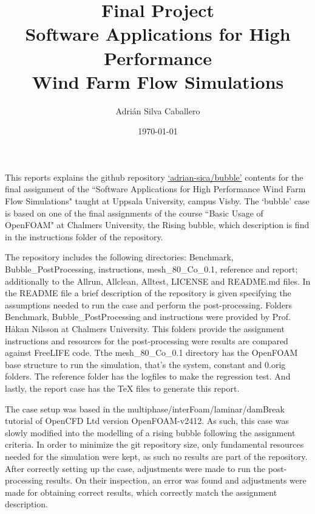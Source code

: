 \documentclass[a4paper,12pt]{article}
\title{\vspace{0.5cm}\textbf{Final Project}\vspace{0.5cm}\\ Software Applications for High Performance \\Wind Farm Flow Simulations}
\author{Adri\'an Silva Caballero}
\date{\today}
\begin{document}
\maketitle


This reports explains the github repository  \href{https://github.com/adrian-sica/bubble.git}{`adrian-sica/bubble'} contents for the final assignment of the ``Software Applications for High Performance Wind Farm Flow Simulations" taught at Uppsala University, campus Visby. The `bubble' case is based on one of the final assignments of the course ``Basic Usage of OpenFOAM" at Chalmers University, the Rising bubble, which description is find in the instructions folder of the repository.

The repository includes the following directories: Benchmark, Bubble\_PostProcessing, instructions, mesh\_80\_Co\_0.1, reference and report; additionally to the Allrun, Allclean, Alltest, LICENSE and README.md files. In the README file a brief description of the repository is given specifying the assumptions needed to run the case and perform the post-processing. Folders Benchmark, Bubble\_PostProcessing and instructions were provided by Prof. Håkan Nilsson at Chalmers University. This folders provide the assignment instructions and resources for the post-processing were results are compared against FreeLIFE code. Tthe mesh\_80\_Co\_0.1 directory has the OpenFOAM base structure to run the simulation, that's the system, constant and 0.orig folders. The reference folder has the logfiles to make the regression test. And lastly, the report case has the TeX files to generate this report.

The case setup was based in the multiphase/interFoam/laminar/damBreak tutorial of OpenCFD Ltd version
OpenFOAM-v2412. As such, this case was slowly modified into the modelling of a rising bubble following the assignment criteria. In order to minimize the git repository size, only fundamental resources needed for the simulation were kept, as such no results are part of the repository. After correctly setting up the case, adjustments were made to run the post-processing results. On their inspection, an error was found and adjustments were made for obtaining correct results, which correctly match the assignment description.
\end{document}
